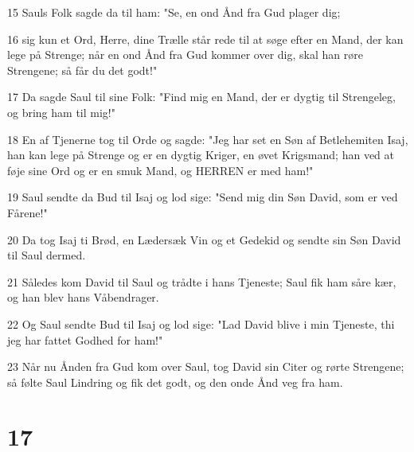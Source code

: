\par 15 Sauls Folk sagde da til ham: "Se, en ond Ånd fra Gud plager dig;
\par 16 sig kun et Ord, Herre, dine Trælle står rede til at søge efter en Mand, der kan lege på Strenge; når en ond Ånd fra Gud kommer over dig, skal han røre Strengene; så får du det godt!"
\par 17 Da sagde Saul til sine Folk: "Find mig en Mand, der er dygtig til Strengeleg, og bring ham til mig!"
\par 18 En af Tjenerne tog til Orde og sagde: "Jeg har set en Søn af Betlehemiten Isaj, han kan lege på Strenge og er en dygtig Kriger, en øvet Krigsmand; han ved at føje sine Ord og er en smuk Mand, og HERREN er med ham!"
\par 19 Saul sendte da Bud til Isaj og lod sige: "Send mig din Søn David, som er ved Fårene!"
\par 20 Da tog Isaj ti Brød, en Lædersæk Vin og et Gedekid og sendte sin Søn David til Saul dermed.
\par 21 Således kom David til Saul og trådte i hans Tjeneste; Saul fik ham såre kær, og han blev hans Våbendrager.
\par 22 Og Saul sendte Bud til Isaj og lod sige: "Lad David blive i min Tjeneste, thi jeg har fattet Godhed for ham!"
\par 23 Når nu Ånden fra Gud kom over Saul, tog David sin Citer og rørte Strengene; så følte Saul Lindring og fik det godt, og den onde Ånd veg fra ham.

\chapter{17}


